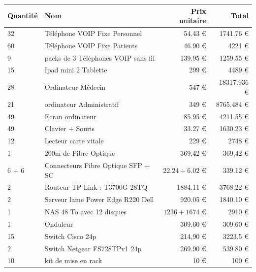     \begin{center}
        \begin{tabular}{|l|p{8cm}|r|r|}
          \hline
            Quantité  & Nom & Prix unitaire & Total \\
          \hline
             32 & Téléphone VOIP Fixe Personnel  & 54.43  \euro & 1741.76 \euro \\
          \hline
            60  & Téléphone VOIP Fixe Patients & 46.90  \euro & 4221 \euro  \\
          \hline
            9  & packs de 3 Téléphones VOIP sans fil & 139.95  \euro & 1259.55 \euro  \\
          \hline
            15  & Ipad mini 2 Tablette  & 299  \euro & 4489 \euro  \\
          \hline
            28  & Ordinateur Médecin  & 547 \euro  & 18317.936 \euro  \\
          \hline
            21  & ordinateur Administratif & 349 \euro & 8765.484 \euro  \\
          \hline
            49  & Ecran ordinateur & 85.95 \euro & 4211.55 \euro  \\
          \hline
            49  & Clavier + Souris & 33.27 \euro & 1630.23 \euro  \\
          \hline
            12  & Lecteur carte vitale & 229 \euro & 2748 \euro  \\
          \hline
            1  & 200m de Fibre Optique & 369,42  \euro & 369,42  \euro  \\
          \hline
            6 + 6  & Connecteurs Fibre Optique SFP + SC & $22.24 + 6.02$  \euro & 339.12 \euro  \\
          \hline
            2  & Routeur TP-Link : T3700G-28TQ & 1884.11 \euro & 3768.22 \euro  \\
          \hline
            2  & Serveur lame Power Edge R220 Dell & 920.05  \euro & 1840.10 \euro  \\
          \hline
            1  & NAS 48 To avec 12 disques & $1236 + 1674$  \euro & 2910 \euro  \\
          \hline
            1  & Onduleur & 309.60  \euro & 309.60  \euro  \\
          \hline
            15  & Switch Cisco 24p & 214,90  \euro & 3223.5 \euro  \\
          \hline
            2  & Switch Netgear FS728TPv1 24p &  269.90 \euro  &  539.80 \euro   \\
          \hline
            10  & kit de mise en rack & 10 \euro & 100 \euro  \\

\end{tabular}
\end{center}
